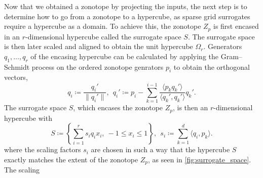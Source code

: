 \documentclass[
  a4paper,  %
  twoside,  %
  bibliography=totoc,
  headsepline,
  cleardoublepage=empty,
  parskip=half,
  draft=false
]{scrbook}
\begin{document}
Now that we obtained a zonotope by projecting the inputs, the next step is to determine how to go from a zonotope to a hypercube, as sparse grid surrogates require a hypercube as a domain.
To achieve this, the zonotope $Z_p$ is first encased in an $r$-dimensional hypercube called the surrogate space $S$.
The surrogate space is then later scaled and aligned to obtain the unit hypercube $\Omega_r$.
Generators $q_1, \dots, q_r$ of the encasing hypercube can be calculated by applying the Gram–Schmidt process on the ordered zonotope genrators $p_i$ to obtain the orthogonal vectors,
\begin{equation}
q_i \coloneqq \frac{q_i'}{\| q_i' \|},~~ q_i' \coloneqq p_i - \sum_{k=1}^{i-1} \frac{\langle p_k q_k'\rangle}{\langle q_k', q_k' \rangle} q_k'.
\label{q}
\end{equation}
%
The surrogate space $S$, which encases the zonotope $Z_p$, is then an $r$-dimensional hypercube with
\begin{equation}
S \coloneqq \left\{\sum_{i=1}^r s_i q_i x_i, ~ -1 \leq x_i \leq 1\right\},~~ s_i \coloneqq \sum_{k=1}^d \langle q_i, p_k\rangle.
\label{surrogate_space}
\end{equation}
where the scaling factors $s_i$ are chosen in such a way that the hypercube $S$ exactly matches the extent of the zonotope $Z_p$, as seen in \cref{fig:surrogate_space}.
The scaling 
\end{document}
